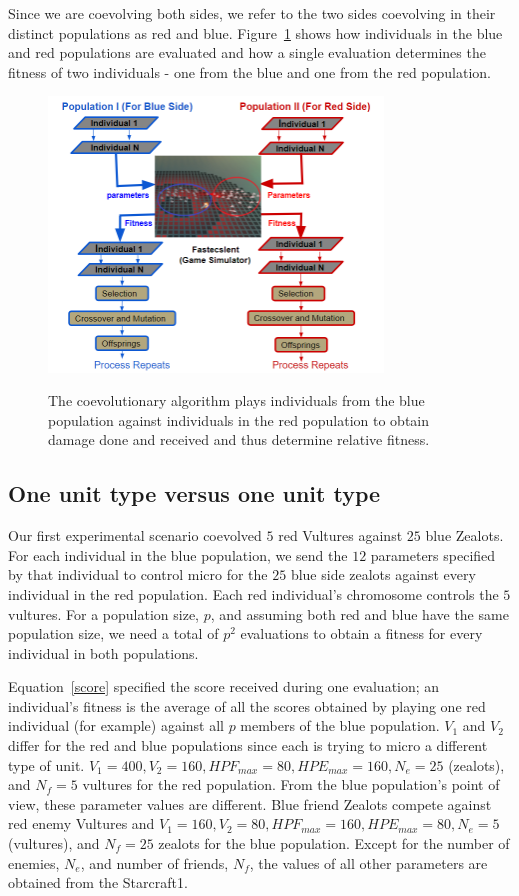 \documentclass[conference,10pt]{IEEEtran}
\begin{document}
Since we are coevolving both sides, we refer to the two sides
coevolving in their distinct populations as red and
blue. Figure~\ref{CGA} shows how individuals in the blue and red
populations are evaluated and how a single evaluation determines the
fitness of two individuals - one from the blue and one from the red
population.
\begin{figure}
\centerline{
  \includegraphics[width=3.5in]{cga.png}
  }
\caption{The coevolutionary algorithm plays individuals from the blue
  population against individuals in the red population to obtain
  damage done and received and thus determine relative fitness.}
{\label{CGA}}
\end{figure}

\subsection{One unit type versus one unit type}

Our first experimental scenario coevolved $5$ red Vultures against
$25$ blue Zealots. For each individual in the blue population, we send
the $12$ parameters specified by that individual to control micro for
the $25$ blue side zealots against every individual in the red
population. Each red individual's chromosome controls the $5$
vultures. For a population size, $p$, and assuming both red and blue
have the same population size, we need a total of $p^2$ evaluations to
obtain a fitness for every individual in both
populations.

Equation~\ref{score} specified the score received during one
evaluation; an individual's fitness is the average of all the scores
obtained by playing one red individual (for example) against all $p$
members of the blue population. $V_1$ and $V_2$ differ for the red and
blue populations since each is trying to micro a different type of
unit.  $V_1 = 400, V_2 = 160, HPF_{max} = 80, HPE_{max} = 160, N_e =
25$ (zealots), and $N_f = 5$ vultures for the red population. From the
blue population's point of view, these parameter values are
different. Blue friend Zealots compete against red enemy Vultures and
$V_1 = 160, V_2 = 80, HPF_{max} = 160, HPE_{max} = 80, N_e = 5$
(vultures), and $N_f = 25$ zealots for the blue population. Except for
the number of enemies, $N_e$, and number of friends, $N_f$, the values
of all other parameters are obtained from the Starcraft1.
\end{document}

